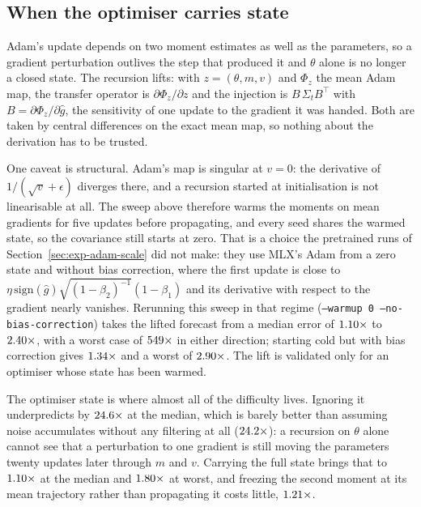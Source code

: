 \subsection{When the optimiser carries state}
\label{sec:exp-adam}

Adam's update depends on two moment estimates as well as the parameters, so a gradient perturbation
outlives the step that produced it and $\theta$ alone is no longer a closed state. The recursion
lifts: with $z = (\theta, m, v)$ and $\Phi_z$ the mean Adam map, the transfer operator is
$\partial\Phi_z/\partial z$ and the injection is $B\,\Sigma_t B^{\!\top}$ with
$B = \partial\Phi_z/\partial \hat{g}$, the sensitivity of one update to the gradient it was handed.
Both are taken by central differences on the exact mean map, so nothing about the derivation has to
be trusted.

One caveat is structural. Adam's map is singular at $v = 0$: the derivative of
$1/(\sqrt{v} + \epsilon)$ diverges there, and a recursion started at initialisation is not
linearisable at all. The sweep above therefore warms the moments on mean gradients for five
updates before propagating, and every seed shares the warmed state, so the covariance still starts
at zero. That is a choice the pretrained runs of Section~\ref{sec:exp-adam-scale} did not make:
they use MLX's Adam from a zero state and without bias correction, where the first update is close
to $\eta\,\mathrm{sign}(\hat g)\sqrt{(1-\beta_2)^{-1}}(1-\beta_1)$ and its derivative with respect
to the gradient nearly vanishes. Rerunning this sweep in that regime
(\texttt{--warmup 0 --no-bias-correction}) takes the lifted forecast from a median error of
$1.10\times$ to $2.40\times$, with a worst case of
$549\times$ in either direction; starting cold but with bias correction gives
$1.34\times$ and a worst of $2.90\times$. The lift is validated
only for an optimiser whose state has been warmed.

\begin{table}[t]
  \centering
  \small
  
  \caption{Predicted against measured seed divergence under Adam, over $24$ settings. The
  parameter-only row uses the same operators restricted to their $\theta$ block, so it isolates the
  cost of pretending the optimiser state does not carry a perturbation forward.}
  \label{tab:adam-lift}
\end{table}

The optimiser state is where almost all of the difficulty lives. Ignoring it underpredicts by
$24.6\times$ at the median, which is barely better than assuming noise accumulates without any
filtering at all ($24.2\times$): a recursion on $\theta$ alone cannot see that a perturbation to
one gradient is still moving the parameters twenty updates later through $m$ and $v$. Carrying the
full state brings that to $1.10\times$ at the median and $1.80\times$ at worst, and freezing the
second moment at its mean trajectory rather than propagating it costs little, $1.21\times$.

